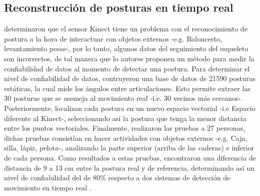 \subsection{Reconstrucci\'on de posturas en tiempo real} \label{tr:2}
 determinaron que el sensor Kinect tiene un problema con el reconocimiento de postura a la hora de interactuar con objetos externos -e.g. Baloncesto, levantamiento pesas-, por lo tanto, algunos datos del seguimiento del esqueleto son incorrectos, de tal manera que lo autores proponen un m\'etodo para medir la confiabilidad de datos al momento de detectar una postura.
\medbreak
Para determinar el nivel de confiabilidad de datos,  contruyeron una base de datos de 21590 posturas est\'aticas, la cual mide los \'angulos entre articulaciones. Esto permite  extraer las 30 posturas que se asemeja al movimiento real -i.e. 30 vecinos m\'as cercanos-.  Posteriormente, localizan cada postura en un nuevo espacio vectorial -i.e Espacio diferente al Kinect-, seleccionando as\'i la postura que tenga la menor distancia entre los puntos vectoriales.
\medbreak
Finalmente,  realizaron las pruebas a 27 personas, dichas pruebas consist\'ian en hacer actividades con objetos externos -e.g. Caja, silla, l\'apiz, pelota-, analizando la parte superior (arriba de las caderas) e inferior de cada persona. Como resultados a estas pruebas, encontraron una diferencia de distancia de 9 a 13 cm entre la postura real y de referencia, determinando as\'i un nivel de confiabilidad del de 80\% respecto a dos sistemas de detecci\'on de movimiento en tiempo real \cite{shum2011fast,shum2012real}.

